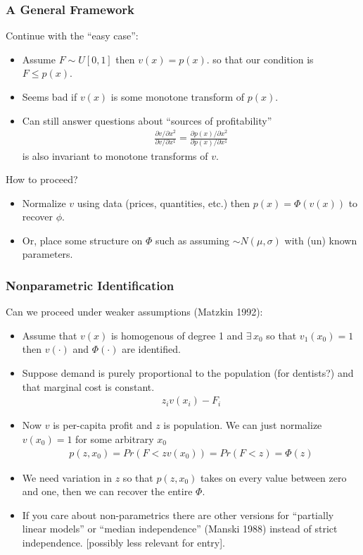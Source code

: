 \documentclass[aspectratio=169,11pt]{beamer}
\begin{document}
\begin{frame}
\frametitle{A General Framework}
Continue with the ``easy case'':
\begin{itemize}
\item Assume $F \sim U[0,1]$ then $v(x) = p(x)$. so that our condition is $F \leq p(x)$.
\item Seems bad if $v(x)$ is some monotone transform of $p(x)$.
\item Can still answer questions about ``sources of profitability''
\begin{eqnarray*}
\frac{\partial v/ \partial x^2}{\partial v/ \partial x^1} = \frac{\partial p(x) / \partial x^2}{\partial p(x)/ \partial x^1}
\end{eqnarray*}
is also invariant to monotone transforms of $v$.
\end{itemize}
How to proceed?
\begin{itemize}
\item Normalize $v$ using data (prices, quantities, etc.) then $p(x) = \Phi(v(x))$ to recover $\phi$.
\item Or, place some structure on $\Phi$ such as assuming $\sim N(\mu,\sigma)$ with (un) known parameters.
\end{itemize}
\end{frame}

\begin{frame}
\frametitle{Nonparametric Identification}
\small
Can we proceed under weaker assumptions (Matzkin 1992):
\begin{itemize}
\item Assume that $v(x)$ is homogenous of degree 1 and $\exists\, x_0$ so that $v_1(x_0) =1$ then $v(\cdot)$ and $\Phi(\cdot)$ are identified.
\item Suppose demand is purely proportional to the population (for dentists?) and that marginal cost is constant.
\begin{eqnarray*}
z_i v(x_i) - F_i
\end{eqnarray*}
\item Now $v$ is per-capita profit and $z$ is population. We can just normalize $v(x_0)=1$ for some arbitrary $x_0$
\begin{eqnarray*}
p(z,x_0) = Pr(F < z v(x_0)) = Pr( F < z) = \Phi(z)
\end{eqnarray*}
\item We need variation in $z$ so that $p(z,x_0)$ takes on every value between zero and one, then we can recover the entire $\Phi$.
\item If you care about non-parametrics there are other versions for ``partially linear models'' or ``median independence'' (Manski 1988) instead of strict independence. [possibly less relevant for entry].
\end{itemize}
\end{frame}
\end{document}
